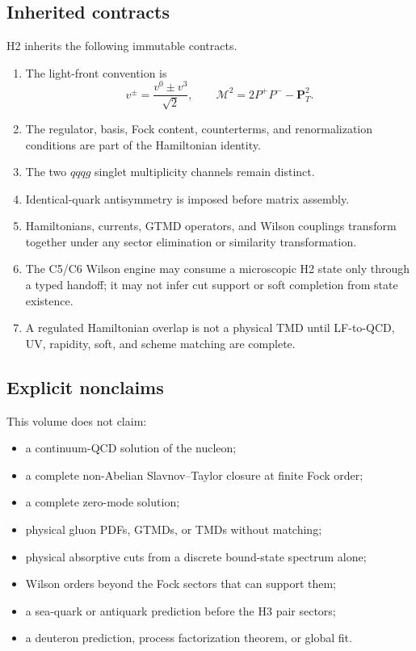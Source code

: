 \documentclass[11pt]{article}
\newcommand{\cM}{\mathcal M}
\begin{document}
\subsection{Inherited contracts}

H2 inherits the following immutable contracts.
\begin{enumerate}
 \item The light-front convention is
 \begin{equation}
  v^{\pm}=\frac{v^0\pm v^3}{\sqrt2},
  \qquad
  \cM^2=2P^+P^- -\bm P_T^2.
 \end{equation}
 \item The regulator, basis, Fock content, counterterms, and renormalization
 conditions are part of the Hamiltonian identity.
 \item The two \(qqqg\) singlet multiplicity channels remain distinct.
 \item Identical-quark antisymmetry is imposed before matrix assembly.
 \item Hamiltonians, currents, GTMD operators, and Wilson couplings transform
 together under any sector elimination or similarity transformation.
 \item The C5/C6 Wilson engine may consume a microscopic H2 state only through
 a typed handoff; it may not infer cut support or soft completion from state
 existence.
 \item A regulated Hamiltonian overlap is not a physical TMD until LF-to-QCD,
 UV, rapidity, soft, and scheme matching are complete.
\end{enumerate}

\subsection{Explicit nonclaims}

This volume does not claim:
\begin{itemize}
 \item a continuum-QCD solution of the nucleon;
 \item a complete non-Abelian Slavnov--Taylor closure at finite Fock order;
 \item a complete zero-mode solution;
 \item physical gluon PDFs, GTMDs, or TMDs without matching;
 \item physical absorptive cuts from a discrete bound-state spectrum alone;
 \item Wilson orders beyond the Fock sectors that can support them;
 \item a sea-quark or antiquark prediction before the H3 pair sectors;
 \item a deuteron prediction, process factorization theorem, or global fit.
\end{itemize}
\end{document}
